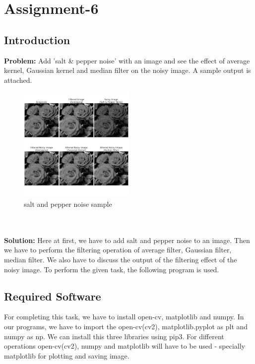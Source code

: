\documentclass{article}
\begin{document}
{
    \section{Assignment-6}
    \subsection{Introduction}
    \textbf {Problem: }
    Add 'salt & pepper noise' with an image and see the effect of average kernel, Gaussian kernel and median filter on the noisy image. A sample output is attached.
    \begin{figure}[htp]
        \centering
        \includegraphics[width=0.5\textwidth]{Assignment-6/Salt_Pepper_Noisy_Rose.jpeg}
        \caption{salt and pepper noise sample}
    \end{figure}
    \\
    \\
    \textbf{Solution: }
    Here at first, we have to add salt and pepper noise to an image. Then we have to perform the filtering operation of average filter, Gaussian filter, median filter. We also have to discuss the output of the filtering effect of the noisy image. To perform the given task, the following program is used.
    \\
    
    \subsection{Required Software}
    For completing this task, we have to install open-cv, matplotlib and numpy. In our programs, we have to import the open-cv(cv2), matplotlib.pyplot as plt and numpy as np. We can install this three libraries using pip3. For different operations open-cv(cv2), numpy and matplotlib will have to be used - specially matplotlib for plotting and saving image. 
    \\
    
}
\end{document}
